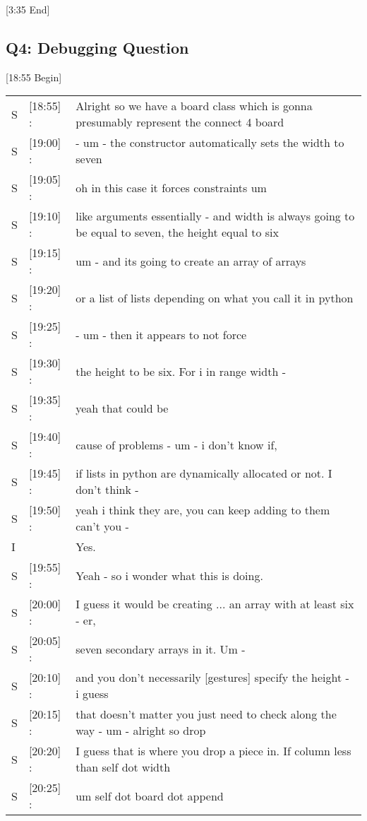 [3:35 End]



\subsection{Q4: Debugging Question}

[18:55 Begin] \\
\begin{tabular}{llp{13cm}}
S&[18:55] :& Alright so we have a board class which is gonna presumably represent the connect 4 board  \\
S&[19:00] :& - um - the constructor automatically sets the width to seven \\
S&[19:05] :& oh in this case it forces constraints um \\
S&[19:10] :& like arguments essentially - and width is always going to be equal to seven, the height equal to six \\
S&[19:15] :& um - and its going to create an array of arrays \\
S&[19:20] :& or a list of lists depending on what you call it in python \\
S&[19:25] :& - um - then it appears to not force \\
S&[19:30] :& the height to be six. For i in range width - \\ 
S&[19:35] :& yeah that could be \\
S&[19:40] :& cause of problems - um - i don't know if, \\
S&[19:45] :& if lists in python are dynamically allocated or not. I don't think - \\
S&[19:50] :& yeah i think they are, you can keep adding to them can't you - \\
I&& Yes. \\
S&[19:55] :& Yeah - so i wonder what this is doing. \\
S&[20:00] :& I guess it would be creating ... an array with at least six - er, \\
S&[20:05] :& seven secondary arrays in it. Um - \\
S&[20:10] :& and you don't necessarily [gestures] specify the height - i guess \\
S&[20:15] :& that doesn't matter you just need to check along the way - um - alright so drop \\
S&[20:20] :& I guess that is where you drop a piece in. If column less than self dot width \\
S&[20:25] :& um self dot board dot append \\

\end{tabular}
